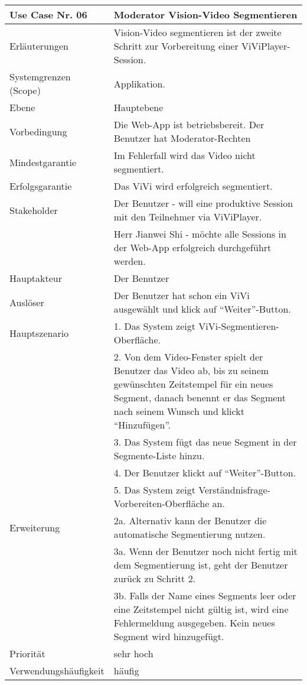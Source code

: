 \begin{tabularx}{\linewidth}{|l|X|}
	\hline
	Use Case Nr. 06			& \textbf{Moderator Vision-Video Segmentieren} \\ \hline
	Erläuterungen			& Vision-Video segmentieren ist der zweite Schritt zur 
							  Vorbereitung einer ViViPlayer-Session. \\ \hline
	Systemgrenzen (Scope)	& Applikation. \\ \hline
	Ebene					& Hauptebene \\ \hline
	Vorbedingung			& Die Web-App ist betriebsbereit. Der Benutzer hat Moderator-Rechten \\ \hline
	Mindestgarantie			& Im Fehlerfall wird das Video nicht segmentiert. \\ \hline
	Erfolgsgarantie			& Das ViVi wird erfolgreich segmentiert. \\ \hline
	Stakeholder				& Der Benutzer - will eine produktive Session mit den Teilnehmer via
							  ViViPlayer. \\
							& Herr Jianwei Shi - möchte alle Sessions in der Web-App erfolgreich durchgeführt
							  werden. \\ \hline
	Hauptakteur				& Der Benutzer \\ \hline
	Auslöser				& Der Benutzer hat schon ein ViVi ausgewählt und klick auf ``Weiter''-Button. 
							  \\ \hline	
	Hauptszenario			& 1. Das System zeigt ViVi-Segmentieren-Oberfläche. \\
							& 2. Von dem Video-Fenster spielt der Benutzer das Video ab, bis zu seinem
							  gewünschten Zeitstempel für ein neues Segment, danach benennt er das Segment nach 
							  seinem Wunsch und klickt ``Hinzufügen''. \\
							& 3. Das System fügt das neue Segment in der Segmente-Liste hinzu. \\
							& 4. Der Benutzer klickt auf ``Weiter''-Button. \\
							& 5. Das System zeigt Verständnisfrage-Vorbereiten-Oberfläche   
							  an. \\ \hline
	Erweiterung				& 2a. Alternativ kann der Benutzer die automatische 
							  Segmentierung nutzen. \\
							& 3a. Wenn der Benutzer noch nicht fertig mit dem Segmentierung 
							  ist, geht der Benutzer zurück zu Schritt 2. \\ 
							& 3b. Falls der Name eines Segments leer oder eine Zeitstempel 
							  nicht gültig ist, wird eine Fehlermeldung ausgegeben. Kein neues Segment wird hinzugefügt. \\ \hline
	Priorität				& sehr hoch \\ \hline
	Verwendungshäufigkeit	& häufig \\ \hline
\end{tabularx}